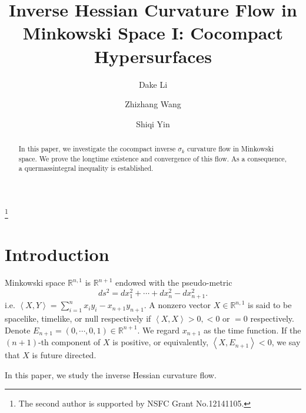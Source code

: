 \documentclass[reqno]{amsart}
\theoremstyle{remark}
\newcommand{\R}{\ensuremath{\mathbb{R}}}
\newcommand{\ip}[2]{\ensuremath{\left< {#1}, {#2} \right>}}
\theoremstyle{definition}
\numberwithin{equation}{section}
\begin{document}
\title[Inverse curvature flow]
{Inverse Hessian Curvature Flow in Minkowski Space I: Cocompact Hypersurfaces}


\author[D. Li]{Dake Li}
\address[D. Li]{School of Mathematical Science\\
Fudan University\\
200433 Shanghai\\
P.R. China}

\author[Z. Wang]{Zhizhang Wang}
\address[Z. Wang]{School of Mathematical Science\\
Fudan University\\
200433 Shanghai\\
P.R. China}


\author[S. Yin]{Shiqi Yin}
\address[S. Yin]{School of Mathematical Science\\
Fudan University\\
200433 Shanghai\\
P.R. China}



\thanks{The second author is supported by NSFC Grant No.12141105.}



\begin{abstract}
	In this paper, we investigate the cocompact inverse \(\sigma_k\) curvature flow in Minkowski space. We prove the longtime existence and convergence of this flow. As a consequence, a quermassintegral inequality is established. 
\end{abstract}

\maketitle 

\section{Introduction}
Minkowski space \(\R^{n,1}\) is  \(\R^{n+1}\) endowed with the pseudo-metric 
\[ ds^2 = dx_1^2 +\cdots + dx_n^2 - dx_{n+1}^2. \] i.e. \(\ip{X}{Y} = \sum_{i=1}^{n}x_i y_i - x_{n+1}y_{n+1}\). A nonzero vector \(X \in \R^{n,1}\) is said to be spacelike, timelike, or null respectively if \(\ip{X}{X} > 0, < 0\) or \(=0\) respectively. Denote \(E_{n+1} = (0,\cdots,0,1)\in \R^{n+1}\). We regard \(x_{n+1}\) as the time function. If the  \((n+1)\)-th component of \(X\) is positive, or equivalently, \(\ip{X}{E_{n+1}} < 0\), we say that \(X\) is future directed. 
\par In this paper, we study the inverse Hessian curvature flow. 
\end{document}
